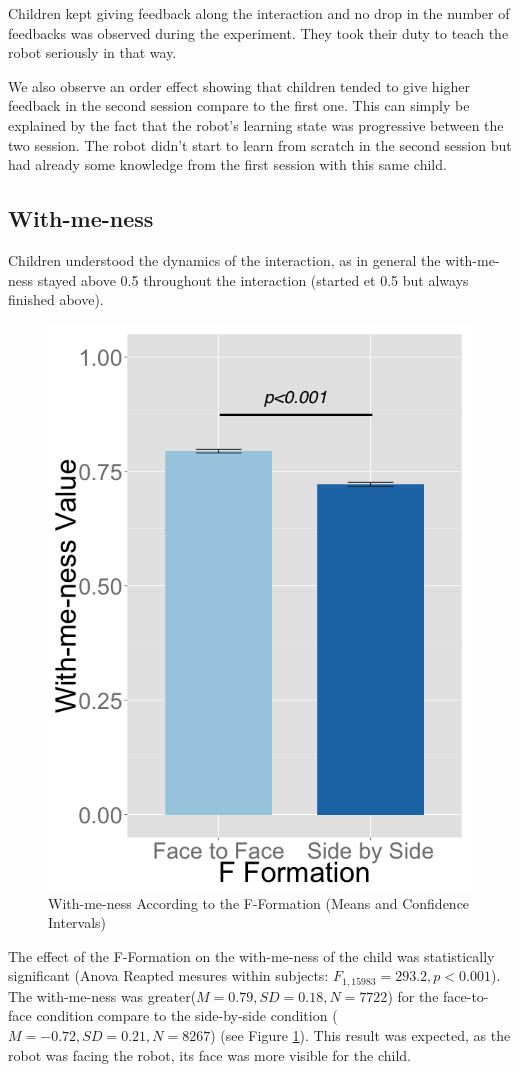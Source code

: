 \documentclass[letterpaper, 10 pt, conference]{ieeeconf}  %
\begin{document}
Children kept giving feedback along the interaction and no drop in the number of feedbacks was observed during the experiment.
They took their duty to teach the robot seriously in that way.

We also observe an order effect showing that children tended to give higher feedback in the second session compare to the first one.
This can simply be explained by the fact that the robot's learning state was progressive between the two session. 
The robot didn't start to learn from scratch in the second session but had already some knowledge from the first session with this same child. 





\subsection{With-me-ness}
Children understood the dynamics of the interaction, as in general the with-me-ness stayed above 0.5 throughout the interaction (started et 0.5 but always finished above).
\begin{figure}	
\centering
\includegraphics[width=0.6\linewidth]{figures/plots/withmeness_fformation_ci}
\caption{With-me-ness According to the F-Formation (Means and Confidence Intervals)}
\label{fig:withmeness_fformation_ci}
\end{figure}
 The effect of the F-Formation on the with-me-ness of the child was statistically significant (Anova Reapted mesures within subjects: $F_{1,15983}= 293.2, p<0.001$). The with-me-ness was greater($M=0.79, SD=0.18, N=7722$) for the face-to-face condition compare to the side-by-side condition ($M=-0.72, SD=0.21, N=8267$) (see Figure \ref{fig:withmeness_fformation_ci}).
 This result was expected, as the robot was facing the robot, its face was more visible for the child.
\end{document}
